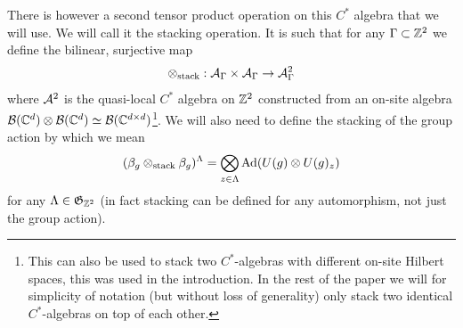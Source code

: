 \documentclass[11pt,a4paper,twoside]{article}
\numberwithin{equation}{section}
\begin{document}
	There is however a second tensor product operation on this $C^*$ algebra that we will use. We will call it the stacking operation. It is such that for any $\Gamma\subset\ZZ^2$ we define the bilinear, surjective map
	\begin{equation}
		\otimes_{\text{stack}}:\AA_{\Gamma}\times\AA_{\Gamma}\rightarrow \AA^2_{\Gamma}
	\end{equation}
	where $\AA^2$ is the quasi-local $C^*$ algebra on $\ZZ^2$ constructed from an on-site algebra $\BB(\CC^d)\otimes\BB(\CC^d)\simeq \BB(\CC^{d\times d})$\footnote{This can also be used to stack two $C^*$-algebras with different on-site Hilbert spaces, this was used in the introduction. In the rest of the paper we will for simplicity of notation (but without loss of generality) only stack two identical $C^*$-algebras on top of each other.}. We will also need to define the stacking of the group action by which we mean
	\begin{equation}
		(\beta_g\otimes_{\text{stack}}\beta_g)^\Lambda=\bigotimes_{z\in\Lambda}\Ad{U(g)\otimes U(g)_z}
	\end{equation}
	for any $\Lambda\in\mathfrak{G}_{\ZZ^2}$ (in fact stacking can be defined for any automorphism, not just the group action).
\end{document}
